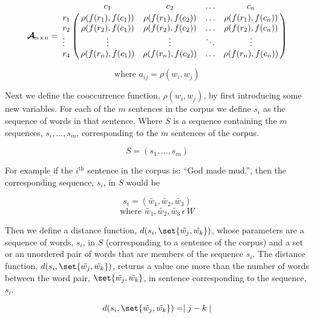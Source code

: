 \documentclass{article}
\begin{document}
\begin{equation*}
\mat{A}{n}{n}=
\bordermatrix{&c_1&c_2&\ldots &c_n\cr
                r_1&\rho(f(r_1), f(c_1)) &  \rho(f(r_1), f(c_2))  & \ldots & \rho(f(r_1), f(c_n))\cr
                r_2&\rho(f(r_2), f(c_1))  &  \rho(f(r_2), f(c_2)) & \ldots & \rho(f(r_2), f(c_n))\cr
                \vdots& \vdots & \vdots & \ddots & \vdots\cr
                r_4&\rho(f(r_n), f(c_1))  &   \rho(f(r_n), f(c_2))   &\ldots & \rho(f(r_n), f(c_n))}
\end{equation*}

\begin{equation*}
\text{where } a_{ij} = \rho(w_i,w_j)
\end{equation*}

Next we define the cooccurrence function, $\rho(w_i, w_j)$, by first introducing some new variables. For each of the $m$ sentences in the corpus we define $s_i$ as the sequence of words in that sentence. Where $S$ is a sequence containing the $m$ sequences, $s_i, \ldots, s_m$, corresponding to the $m$ sentences of the corpus.

\begin{equation*}
S = \left( s_1, \ldots, s_m \right)
\end{equation*}

For example if the $i^{\text{th}}$ sentence in the corpus is: ``God made mud.'', then the corresponding sequence, $s_i$, in $S$ would be

\begin{equation*}
s_i = \left( \tilde{w_1}, \tilde{w_2}, \tilde{w_3} \right)
\end{equation*}
\begin{equation*}
\text{where } \tilde{w_1}, \tilde{w_2}, \tilde{w_3} \, \epsilon \, W
\end{equation*}

Then we define a distance function, $d(s_i, \set{\tilde{w_j}, \tilde{w_k}})$, whose parameters are a sequence of words, $s_i$, in $S$ (corresponding to a sentence of the corpus) and a set or an unordered pair of words that are members of the sequence $s_i$. The distance function, $d(s_i, \set{\tilde{w_j}, \tilde{w_k}})$, returns a value one more than the number of words between the word pair, $\set{\tilde{w_j}, \tilde{w_k}}$, in sentence corresponding to the sequence, $s_i$.

\begin{equation*}
d(s_i, \set{\tilde{w_j}, \tilde{w_k}}) = \mid j - k \mid
\end{equation*}
\end{document}
